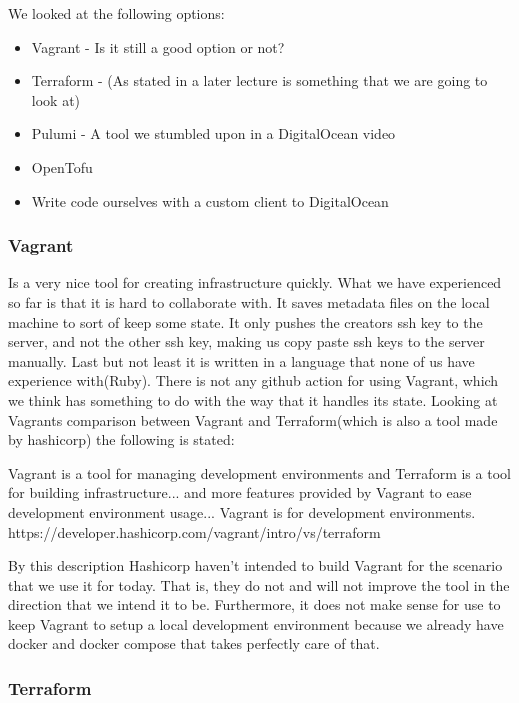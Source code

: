 We looked at the following options:
\begin{itemize}
    \item Vagrant - Is it still a good option or not?
    \item Terraform - (As stated in a later lecture is something that we are going to look at)
    \item Pulumi - A tool we stumbled upon in a DigitalOcean video
    \item OpenTofu
    \item Write code ourselves with a custom client to DigitalOcean
\end{itemize}

\subsubsection{Vagrant}

Is a very nice tool for creating infrastructure quickly. What we have experienced so far is that it is hard to collaborate with. It saves metadata files on the local machine to sort of keep some state. It only pushes the creators ssh key to the server, and not the other ssh key, making us copy paste ssh keys to the server manually. Last but not least it is written in a language that none of us have experience with(Ruby).
There is not any github action for using Vagrant, which we think has something to do with the way that it handles its state. Looking at Vagrants comparison between Vagrant and Terraform(which is also a tool made by hashicorp) the following is stated:

Vagrant is a tool for managing development environments and Terraform is a tool for building infrastructure... and more features provided by Vagrant to ease development environment usage... Vagrant is for development environments.
 https://developer.hashicorp.com/vagrant/intro/vs/terraform


By this description Hashicorp haven't intended to build Vagrant for the scenario that we use it for today. That is, they do not and will not improve the tool in the direction that we intend it to be. Furthermore, it does not make sense for use to keep Vagrant to setup a local development environment because we already have docker and docker compose that takes perfectly care of that.

\subsubsection{Terraform}

